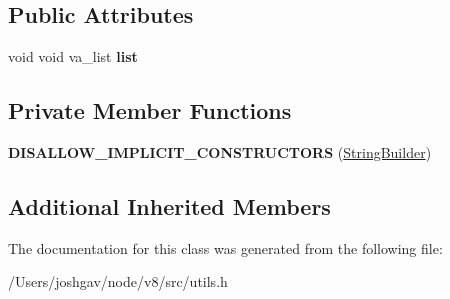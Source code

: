 \subsection*{Public Attributes}
\begin{DoxyCompactItemize}
\item 
void void va\+\_\+list {\bfseries list}\hypertarget{classv8_1_1internal_1_1_string_builder_a5d0a95066ae5f8c2469e4123d900548c}{}\label{classv8_1_1internal_1_1_string_builder_a5d0a95066ae5f8c2469e4123d900548c}

\end{DoxyCompactItemize}
\subsection*{Private Member Functions}
\begin{DoxyCompactItemize}
\item 
{\bfseries D\+I\+S\+A\+L\+L\+O\+W\+\_\+\+I\+M\+P\+L\+I\+C\+I\+T\+\_\+\+C\+O\+N\+S\+T\+R\+U\+C\+T\+O\+RS} (\hyperlink{classv8_1_1internal_1_1_string_builder}{String\+Builder})\hypertarget{classv8_1_1internal_1_1_string_builder_a3f54d63f4744c6cd64b8d9502c66c294}{}\label{classv8_1_1internal_1_1_string_builder_a3f54d63f4744c6cd64b8d9502c66c294}

\end{DoxyCompactItemize}
\subsection*{Additional Inherited Members}


The documentation for this class was generated from the following file\+:\begin{DoxyCompactItemize}
\item 
/\+Users/joshgav/node/v8/src/utils.\+h\end{DoxyCompactItemize}
